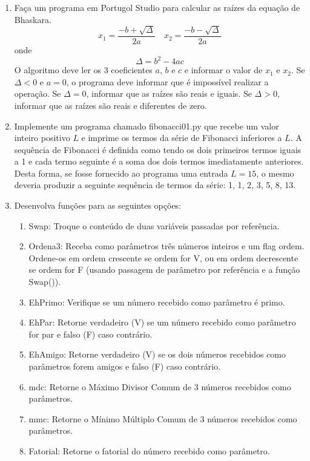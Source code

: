 \documentclass[12pt]{article}
\begin{document}
\begin{enumerate}
	\item  Faça um programa em Portugol Studio para calcular as raízes da equação de Bhaskara. 
	\[ x_{1} = \frac{-b + \sqrt{\Delta}}{2a} \quad x_{2} = \frac{-b - \sqrt{\Delta}}{2a} \]
	onde
	\[ \Delta = b^{2} - 4ac \]
	O algoritmo deve ler os 3 coeficientes \(a\), \(b\) e \(c\) e informar o valor de \(x_{1}\) e \(x_{2}\). Se \(\Delta < 0\) e \(a = 0\), o programa deve informar que é impossível realizar a operação. Se \(\Delta = 0\), informar que as raízes são reais e iguais. Se \(\Delta > 0\), informar que as raízes são reais e diferentes de zero.
	
	\item Implemente um programa chamado fibonacci01.py que recebe um valor inteiro positivo \(L\) e imprime os termos da série de Fibonacci inferiores a \(L\). A sequência de Fibonacci é definida como tendo os dois primeiros termos iguais a 1 e cada termo seguinte é a soma dos dois termos imediatamente anteriores. Desta forma, se fosse fornecido ao programa uma entrada \(L = 15\), o mesmo deveria produzir a seguinte sequência de termos da série: 1, 1, 2, 3, 5, 8, 13.
	
	\item Desenvolva funções para as seguintes opções:
	\begin{enumerate}
		\item Swap: Troque o conteúdo de duas variáveis passadas por referência.
		\item Ordena3: Receba como parâmetros três números inteiros e um flag ordem. Ordene-os em ordem crescente se ordem for V, ou em ordem decrescente se ordem for F (usando passagem de parâmetro por referência e a função Swap()).
		\item EhPrimo: Verifique se um número recebido como parâmetro é primo.
		\item EhPar: Retorne verdadeiro (V) se um número recebido como parâmetro for par e falso (F) caso contrário.
		\item EhAmigo: Retorne verdadeiro (V) se os dois números recebidos como parâmetros forem amigos e falso (F) caso contrário.
		\item mdc: Retorne o Máximo Divisor Comum de 3 números recebidos como parâmetros.
		\item mmc: Retorne o Mínimo Múltiplo Comum de 3 números recebidos como parâmetros.
		\item Fatorial: Retorne o fatorial do número recebido como parâmetro.
	\end{enumerate}
	
		
	\end{enumerate}
	
	
	
\end{document}
